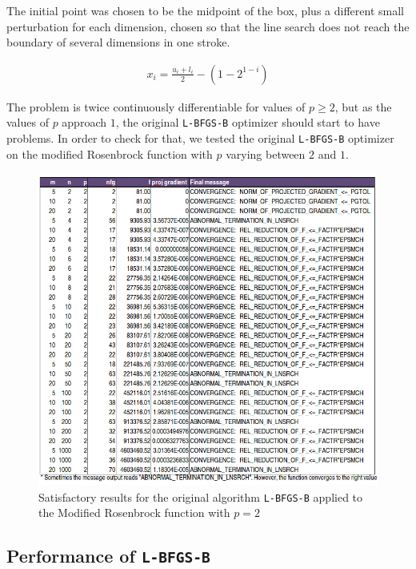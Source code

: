 The initial point was chosen to be the midpoint of the box, plus a different small perturbation for each dimension, chosen so that the line search does not reach the boundary of several dimensions in one stroke.

\begin{equation}
  \begin{aligned}
    x_i = \frac{u_i + l_i}{2} - \left(1 - 2^{1 - i}\right)
  \end{aligned}
\end{equation}

The problem is twice continuously differentiable for values of $p \geq 2$, but as the values of $p$ approach $1$, the original \texttt{L-BFGS-B} optimizer should start to have problems. In order to check for that, we tested the original \texttt{L-BFGS-B} optimizer on the modified Rosenbrock function with $p$ varying between $2$ and $1$. 


\begin{figure}
\begin{center}
\includegraphics[scale=0.58]{Figures/Nocedalp2.png}
\caption[Modified Rosenbrock with $p = 2$]{Satisfactory results for the original algorithm \texttt{L-BFGS-B} applied to the Modified Rosenbrock function with $p = 2$}
\label{pequal2}
\end{center}
\end{figure}

\subsection{Performance of \texttt{L-BFGS-B}}

